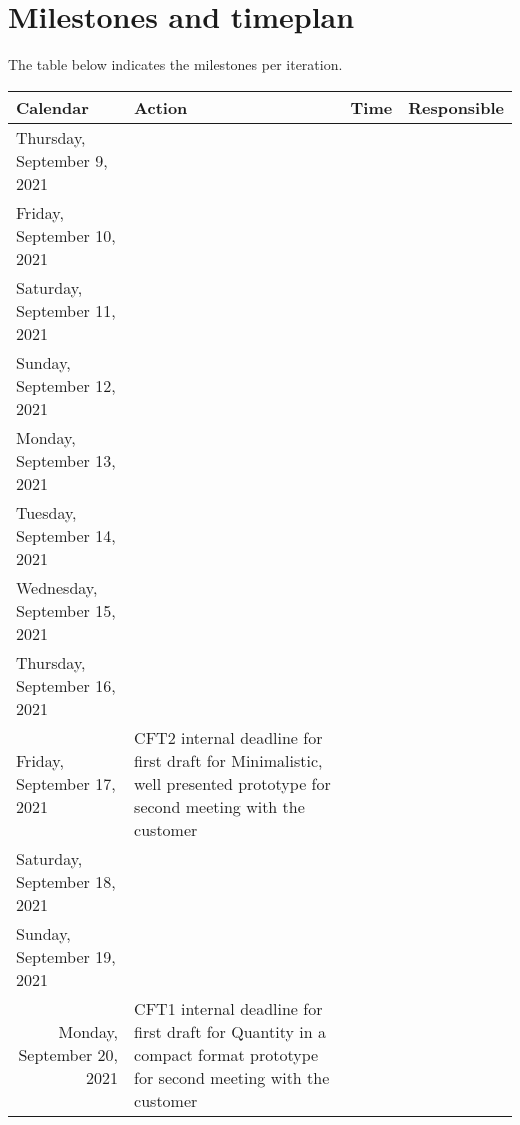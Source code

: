 \section{Milestones and timeplan}
The table below indicates the milestones per iteration.






\begin{adjustbox}{width=1.2\textwidth}

\begin{tabular}{|l|l|l|l|}
\hline
{\bf Calendar} & {\bf Action} & {\bf Time} & {\bf Responsible} \\
\hline
\hline
Thursday, September 9, 2021 &            &            &            \\
\hline
Friday, September 10, 2021 &            &            &            \\
\hline
Saturday, September 11, 2021 &            &            &            \\
\hline
Sunday, September 12, 2021 &            &            &            \\
\hline
Monday, September 13, 2021 &            &            &            \\
\hline
Tuesday, September 14, 2021 &            &            &            \\
\hline
Wednesday, September 15, 2021 &            &            &            \\
\hline
Thursday, September 16, 2021 &            &            &            \\
\hline
Friday, September 17, 2021 & CFT2 internal deadline for first draft for Minimalistic, well presented prototype for second meeting with the customer &            &            \\
\hline
Saturday, September 18, 2021 &            &            &            \\
\hline
Sunday, September 19, 2021 &            &            &            \\
\hline
\multicolumn{ 1}{|r|}{Monday, September 20, 2021} & CFT1 internal deadline for first draft for Quantity in a compact format prototype for second meeting with the customer &            &            \\


\end{tabular}
\end{adjustbox}
